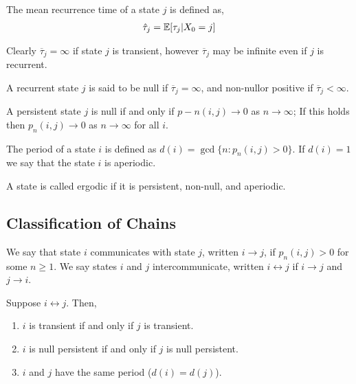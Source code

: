 \documentclass[12pt]{article}
\begin{document}
\begin{definition}
The mean recurrence time of a state \( j \) is defined as,
\begin{align*}
    \hat{\tau}_j = \mathbb{E}[\tau_j | X_0=j]
\end{align*}
\end{definition}

Clearly \( \overline{\tau}_j = \infty \) if state \( j \) is transient, however \( \overline{\tau}_j \) may be infinite even if \( j \) is recurrent.

\begin{definition}
A recurrent state \( j \) is said to be null if \( \overline{\tau}_j = \infty \), and non-nullor positive if \( \overline{\tau}_j < \infty \).
\end{definition}

\begin{theorem}
A persistent state \( j \) is null if and only if \( p-n(i,j) \to 0 \) as \( n\to\infty \); If this holds then \( p_n(i,j) \to 0  \) as \( n\to\infty \) for all \( i \).
\end{theorem}

\begin{definition}[Period]
The period of a state \( i \) is defined as \( d(i) = \operatorname{gcd}\{n : p_n(i,j) > 0 \}  \). If \( d(i) = 1 \) we say that the state \( i \) is aperiodic.
\end{definition}

\begin{definition}[Ergodic]
A state is called ergodic if it is persistent, non-null, and aperiodic.
\end{definition}


\subsection{Classification of Chains}
\begin{definition}[Communicates]
We say that state \( i \) communicates with state \( j \), written \( i\to j \), if \( p_n(i,j) > 0 \) for some \( n\geq1 \). We say states \( i \) and \( j \) intercommunicate, written \( i\leftrightarrow j \) if \( i\to j \) and \( j\to i \).
\end{definition}

\begin{theorem}
Suppose \( i\leftrightarrow j \). Then,
\begin{enumerate}[nolistsep]
    \item \( i \) is transient if and only if \( j \) is transient.
    \item \( i \) is null persistent if and only if \( j \) is null persistent.
    \item \( i \) and \( j \) have the same period (\( d(i) = d(j) \)).
\end{enumerate}
\end{theorem}
\end{document}
